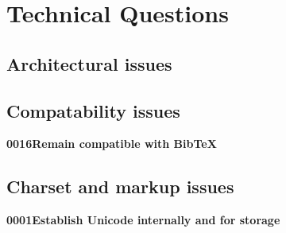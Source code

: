 \newenvironment*{TodoItem}[6][]{%
\begingroup\noindent\textbf{\textsf{#2\quad #6}}\leftskip10pt\\}
{\endgroup}
\section{Technical Questions}
\label{sec:techne}


\subsection{Architectural issues}
\label{sec:tec-archi}


\subsection{Compatability issues}
\label{sec:tec-compat}

\begin{TodoItem}{0016}{}{}{}{Remain compatible with BibTeX}
\end{TodoItem}


\subsection{Charset and markup issues}
\label{sec:tec-chars}

\begin{TodoItem}{0001}{}{}{}{Establish Unicode internally and for
    storage}
\end{TodoItem}

